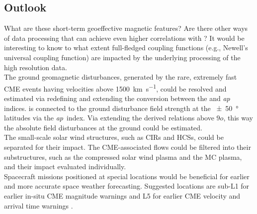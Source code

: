 \subsection*{Outlook}

What are these short-term geoeffective magnetic features? Are there other ways of data processing that can achieve even higher correlations with \Kp{}?
It would be interesting to know to what extent full-fledged coupling functions (e.g., Newell's universal coupling function) are impacted by the underlying processing of the high resolution data.\\

The ground geomagnetic disturbances, generated by the rare, extremely fast CME events having velocities above \SI{1500}{\km\per\s}, could be resolved and estimated via redefining and extending the conversion between the \Kp{} and \textit{ap} indices. \Kp{} is connected to the ground disturbance field strength at the \SI{+-50}{\degree} latitudes via the \textit{ap}~index. Via extending the derived \Kp{} relations above $9o$, this way the absolute field disturbances at the ground could be estimated.\\

The small-scale solar wind structures, such as CIRs and HCSs, could be separated for their \Kp{} impact. The CME-associated flows could be filtered into their substructures, such as the compressed solar wind plasma and the MC plasma, and their \Kp{} impact evaluated individually.\\

Spacecraft missions positioned at special locations would be beneficial for earlier and more accurate space weather forecasting. Suggested locations are sub-L1 for earlier in-situ CME magnitude warnings and L5 for earlier CME velocity and arrival time warnings \citep{Vourlidas2015}.


